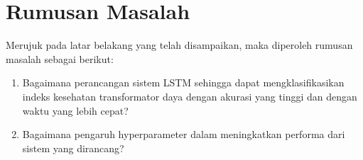 
 



\section{Rumusan Masalah}
Merujuk pada latar belakang yang telah disampaikan, maka diperoleh rumusan masalah sebagai berikut:
\begin{enumerate}
	\item Bagaimana perancangan sistem LSTM sehingga dapat mengklasifikasikan indeks kesehatan transformator daya dengan akurasi yang tinggi dan dengan waktu yang lebih cepat?
	\item Bagaimana pengaruh hyperparameter dalam meningkatkan performa dari sistem yang dirancang?
\end{enumerate}

